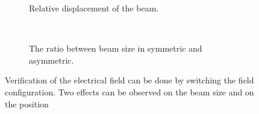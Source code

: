 \begin{figure}[!ht]
  \begin{subfigure}[t]{0.5\textwidth}
    
    \caption{Relative displacement of the beam.}
    \label{chap4:COMSOL_check_a}
  \end{subfigure}
  ~
  \begin{subfigure}[t]{0.5\textwidth}
    
    \caption{The ratio between beam size in symmetric and asymmetric.}
    \label{chap4:COMSOL_check_b}
  \end{subfigure}
  \caption[Verification of the electrical field can be done by switching the field configuration]{Verification of the electrical field can be done by switching the field configuration. Two effects can be observed on the beam size and on the position}
  \label{chap4:COMSOL_check}
\end{figure}
